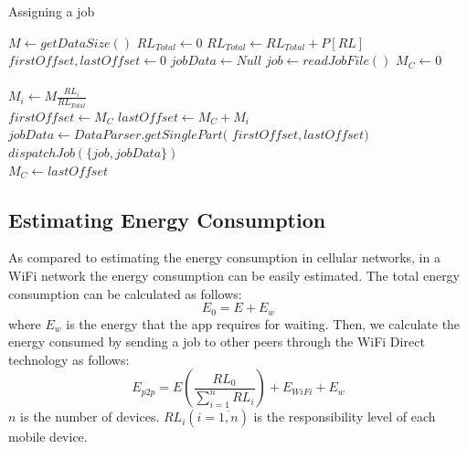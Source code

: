 \documentclass{sig-alternate}[10pt]
\begin{document}
\begin{algorithm}
\caption{Assigning a job}
\label{alg:assign_job}
\begin{algorithmic}[1]
\begin{scriptsize}
\State $M \leftarrow {getDataSize()}$
\State $RL_{Total} \leftarrow 0$ 
  \State $RL_{Total} \leftarrow RL_{Total} + P[RL]$
\EndFor
\\
\State $firstOffset, lastOffset \leftarrow 0$
\State $jobData \leftarrow Null$
\State $job \leftarrow {readJobFile()}$
\State $M_{C} \leftarrow 0$
\\
\\
  \State $M_{i} \leftarrow M\frac{RL_{i}}{RL_{Total}}$\\
  \State $firstOffset \leftarrow M_{C} $
  \State $lastOffset \leftarrow M_{C} + M_{i}$
  \State $jobData \leftarrow DataParser.getSinglePart($
  \State 
		\hspace{\algorithmicindent}
		\hspace{\algorithmicindent}
		\hspace{\algorithmicindent}
		\hspace{\algorithmicindent}
		\hspace{\algorithmicindent}
						$firstOffset, lastOffset)$
  \State $dispatchJob(\{job, jobData\})$\\
  \State $M_{C} \leftarrow lastOffset$
  
\EndFor

\EndFunction
\end{scriptsize}
\end{algorithmic}
\end{algorithm}

\subsection{Estimating Energy Consumption}
As compared to estimating the energy consumption in cellular networks, in a WiFi network the energy consumption can be easily estimated. The total energy consumption can be calculated as follows:
$$E_{0} = E + E_{w}$$
\noindent where $E_{w}$ is the energy that the app requires for waiting. Then, we calculate the energy consumed by sending a job to other peers through the WiFi Direct technology as follows:
$$E_{p2p} = E(\frac{RL_{0}}{\sum_{i = 1}^{n}{RL_{i}}}) + E_{WiFi} + E_{w}$$ 
\noindent $n$ is the number of devices. $RL_{i} (i = \overline{1,n})$ is the responsibility level of each mobile device. 
\end{document}

